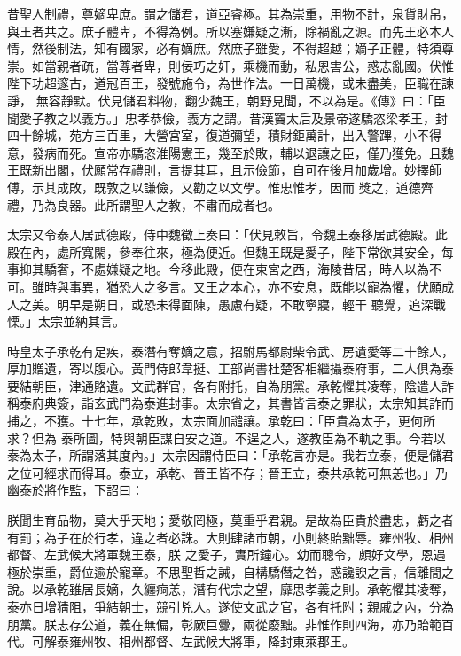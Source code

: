 \begin{pinyinscope}
 昔聖人制禮，尊嫡卑庶。謂之儲君，道亞睿極。其為崇重，用物不計，泉貨財帛，與王者共之。庶子體卑，不得為例。所以塞嫌疑之漸，除禍亂之源。而先王必本人情，然後制法，知有國家，必有嫡庶。然庶子雖愛，不得超越；嫡子正體，特須尊崇。如當親者疏，當尊者卑，則佞巧之奸，乘機而動，私恩害公，惑志亂國。伏惟陛下功超邃古，道冠百王，發號施令，為世作法。一日萬機，或未盡美，臣職在諫諍，
 無容靜默。伏見儲君料物，翻少魏王，朝野見聞，不以為是。《傳》曰：「臣聞愛子教之以義方。」忠孝恭儉，義方之謂。昔漢竇太后及景帝遂驕恣梁孝王，封四十餘城，苑方三百里，大營宮室，復道彌望，積財鉅萬計，出入警蹕，小不得意，發病而死。宣帝亦驕恣淮陽憲王，幾至於敗，輔以退讓之臣，僅乃獲免。且魏王既新出閣，伏願常存禮則，言提其耳，且示儉節，自可在後月加歲增。妙擇師傅，示其成敗，既敦之以謙儉，又勸之以文學。惟忠惟孝，因而
 獎之，道德齊禮，乃為良器。此所謂聖人之教，不肅而成者也。



 太宗又令泰入居武德殿，侍中魏徵上奏曰：「伏見敕旨，令魏王泰移居武德殿。此殿在內，處所寬閑，參奉往來，極為便近。但魏王既是愛子，陛下常欲其安全，每事抑其驕奢，不處嫌疑之地。今移此殿，便在東宮之西，海陵昔居，時人以為不可。雖時與事異，猶恐人之多言。又王之本心，亦不安息，既能以寵為懼，伏願成人之美。明早是朔日，或恐未得面陳，愚慮有疑，不敢寧寢，輕干
 聽覺，追深戰慄。」太宗並納其言。



 時皇太子承乾有足疾，泰潛有奪嫡之意，招駙馬都尉柴令武、房遺愛等二十餘人，厚加贈遺，寄以腹心。黃門侍郎韋挺、工部尚書杜楚客相繼攝泰府事，二人俱為泰要結朝臣，津通賂遺。文武群官，各有附托，自為朋黨。承乾懼其凌奪，陰遣人詐稱泰府典簽，詣玄武門為泰進封事。太宗省之，其書皆言泰之罪狀，太宗知其詐而捕之，不獲。十七年，承乾敗，太宗面加譴讓。承乾曰：「臣貴為太子，更何所求？但為
 泰所圖，特與朝臣謀自安之道。不逞之人，遂教臣為不軌之事。今若以泰為太子，所謂落其度內。」太宗因謂侍臣曰：「承乾言亦是。我若立泰，便是儲君之位可經求而得耳。泰立，承乾、晉王皆不存；晉王立，泰共承乾可無恙也。」乃幽泰於將作監，下詔曰：



 朕聞生育品物，莫大乎天地；愛敬罔極，莫重乎君親。是故為臣貴於盡忠，虧之者有罰；為子在於行孝，違之者必誅。大則肆諸市朝，小則終貽黜辱。雍州牧、相州都督、左武候大將軍魏王泰，朕
 之愛子，實所鐘心。幼而聰令，頗好文學，恩遇極於崇重，爵位逾於寵章。不思聖哲之誡，自構驕僭之咎，惑讒諛之言，信離間之說。以承乾雖居長嫡，久纏痾恙，潛有代宗之望，靡思孝義之則。承乾懼其凌奪，泰亦日增猜阻，爭結朝士，競引兇人。遂使文武之官，各有托附；親戚之內，分為朋黨。朕志存公道，義在無偏，彰厥巨釁，兩從廢黜。非惟作則四海，亦乃貽範百代。可解泰雍州牧、相州都督、左武候大將軍，降封東萊郡王。




\end{pinyinscope}
